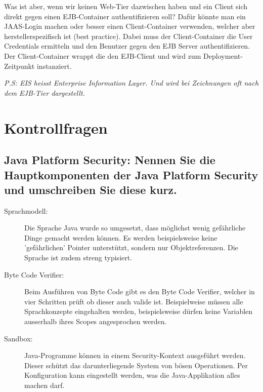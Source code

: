Was ist aber, wenn wir keinen Web-Tier dazwischen haben und ein Client sich direkt gegen einen EJB-Container authentifizieren soll? Dafür könnte man ein JAAS-Login machen oder besser einen Client-Container verwenden, welcher aber herstellerspezifisch ist (best practice). Dabei muss der Client-Container die User Credentials ermitteln und den Benutzer gegen den EJB Server authentifizieren. Der Client-Container wrappt die den EJB-Client und wird zum Deployment-Zeitpunkt instanziert.

\emph{P.S: EIS heisst Enterprise Information Layer. Und wird bei Zeichnungen oft nach dem EJB-Tier dargestellt.} 

\section{Kontrollfragen}

\subsection{Java Platform Security: Nennen Sie die Hauptkomponenten der Java Platform Security und umschreiben Sie diese kurz.}

\begin{description}
	\item[Sprachmodell:] Die Sprache Java wurde so umgesetzt, dass möglichst wenig gefährliche Dinge gemacht werden können. Es werden beispielsweise keine 'gefährlichen' Pointer unterstützt, sondern nur Objektreferenzen. Die Sprache ist zudem streng typisiert.
	
	\item[Byte Code Verifier:] Beim Ausführen von Byte Code gibt es den Byte Code Verifier, welcher in vier Schritten prüft ob dieser auch valide ist. Beispielweise müssen alle Sprachkonzepte eingehalten werden, beispielsweise dürfen keine Variablen ausserhalb ihres Scopes angesprochen werden.
	
	\item[Sandbox:] Java-Programme können in einem Security-Kontext ausgeführt werden. Dieser schützt das darunterliegende System von bösen Operationen. Per Konfiguration kann eingestellt werden, was die Java-Applikation alles machen darf.
	
\end{description}

